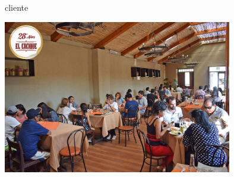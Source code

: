 \begin{enumerate}[1.]
cliente

	\begin{center}
	\includegraphics[width=10cm]{./Imagenes/clientes2} 
	\end{center}

\end{enumerate} 
